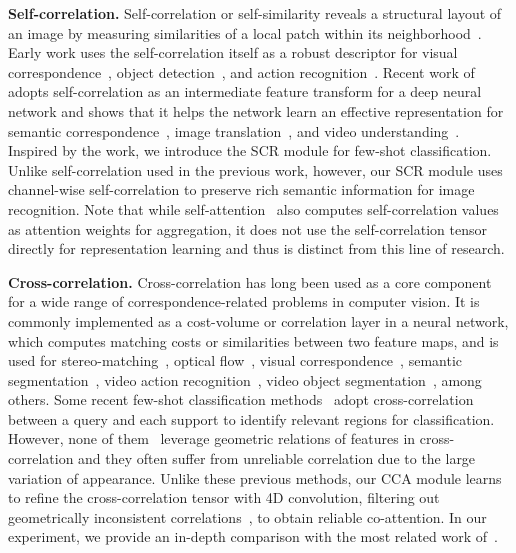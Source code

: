 \documentclass[10pt,twocolumn,letterpaper]{article}
\newcommand{\abbcross}{CCA\xspace}
\newcommand{\smallbreakparagraph}[1]{\smallbreak \noindent \textbf{#1}}
\begin{document}
\smallbreakparagraph{Self-correlation.}
Self-correlation or self-similarity reveals a structural layout of an image by measuring similarities of a local patch within its neighborhood~\cite{shechtman2007matching}.
Early work uses the self-correlation itself as a robust descriptor for visual correspondence~\cite{torabi2013local}, object detection~\cite{deselaers2010global}, and action recognition~\cite{junejo2011view,junejo2008cross}. 
Recent work of~\cite{fcss, zheng2021spatially, stss} adopts self-correlation as an intermediate feature transform for a deep neural network and shows that it helps the network learn an effective representation for semantic correspondence~\cite{fcss}, image translation~\cite{zheng2021spatially}, and video understanding~\cite{stss}.  
Inspired by the work, we introduce the SCR module for few-shot classification. 
Unlike self-correlation used in the previous work, however, our SCR module uses channel-wise self-correlation to preserve rich semantic information for image recognition.
Note that while self-attention~\cite{nlsa,lsa} also computes self-correlation values as attention weights for aggregation, it does not use the self-correlation tensor directly for representation learning and thus is distinct from this line of research.









\smallbreakparagraph{Cross-correlation.}
Cross-correlation has long been used as a core component for a wide range of correspondence-related problems in computer vision. 
It is commonly implemented as a cost-volume or correlation layer in a neural network, which computes matching costs or similarities between two feature maps, and is used for stereo-matching~\cite{zbontar2016stereo,luo2016efficient}, optical flow~\cite{dosovitskiy2015flownet,sun2018pwc,vcn}, visual correspondence~\cite{hpf, dhpf, ncnet, ancnet, chm}, semantic segmentation~\cite{sun2020mining, hsnet}, video action recognition~\cite{wang2020video, motionsqueeze}, video object segmentation~\cite{oh2019video, hu2018videomatch}, among others. 
Some recent few-shot classification methods~\cite{deepemd, li2019revisiting, can, crosstransformers} adopt cross-correlation between a query and each support to identify relevant regions for classification. 
However, none of them~\cite{deepemd, li2019revisiting, crosstransformers, can} leverage geometric relations of features in cross-correlation and they often suffer from unreliable correlation due to the large variation of appearance.
Unlike these previous methods, our \abbcross module learns to refine the cross-correlation tensor with 4D convolution, filtering out geometrically inconsistent correlations~\cite{ncnet, chm}, to obtain reliable co-attention. 
In our experiment, we provide an in-depth comparison with the most related work of~\cite{can}.
\end{document}
